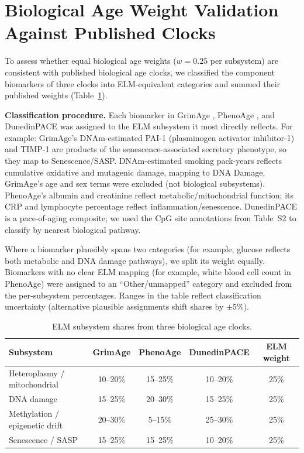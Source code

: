 \documentclass[11pt]{article}
\begin{document}
\section{Biological Age Weight Validation Against Published Clocks}
\label{sec:clock_mapping}

To assess whether equal biological age weights ($w = 0.25$ per subsystem) are consistent with published biological age clocks, we classified the component biomarkers of three clocks into ELM-equivalent categories and summed their published weights (Table~\ref{tab:clock_mapping}).

\textbf{Classification procedure.} Each biomarker in GrimAge \citep{Lu2019}, PhenoAge \citep{Levine2018}, and DunedinPACE \citep{Belsky2022} was assigned to the ELM subsystem it most directly reflects. For example: GrimAge's DNAm-estimated PAI-1 (plasminogen activator inhibitor-1) and TIMP-1 are products of the senescence-associated secretory phenotype, so they map to Senescence/SASP. DNAm-estimated smoking pack-years reflects cumulative oxidative and mutagenic damage, mapping to DNA Damage. GrimAge's age and sex terms were excluded (not biological subsystems). PhenoAge's albumin and creatinine reflect metabolic/mitochondrial function; its CRP and lymphocyte percentage reflect inflammation/senescence. DunedinPACE is a pace-of-aging composite; we used the CpG site annotations from \citet{Belsky2022} Table~S2 to classify by nearest biological pathway.

Where a biomarker plausibly spans two categories (for example, glucose reflects both metabolic and DNA damage pathways), we split its weight equally. Biomarkers with no clear ELM mapping (for example, white blood cell count in PhenoAge) were assigned to an ``Other/unmapped'' category and excluded from the per-subsystem percentages. Ranges in the table reflect classification uncertainty (alternative plausible assignments shift shares by $\pm$5\%).

\begin{table}[H]
\centering
\caption{ELM subsystem shares from three biological age clocks.}
\label{tab:clock_mapping}
\begin{tabular}{@{}lcccc@{}}
\toprule
Subsystem & GrimAge & PhenoAge & DunedinPACE & ELM weight \\
\midrule
Heteroplasmy / mitochondrial & 10--20\% & 15--25\% & 10--20\% & 25\% \\
DNA damage & 15--25\% & 20--30\% & 15--25\% & 25\% \\
Methylation / epigenetic drift & 20--30\% & 5--15\% & 25--30\% & 25\% \\
Senescence / SASP & 15--25\% & 15--25\% & 10--20\% & 25\% \\
\bottomrule
\end{tabular}
\end{table}
\end{document}
